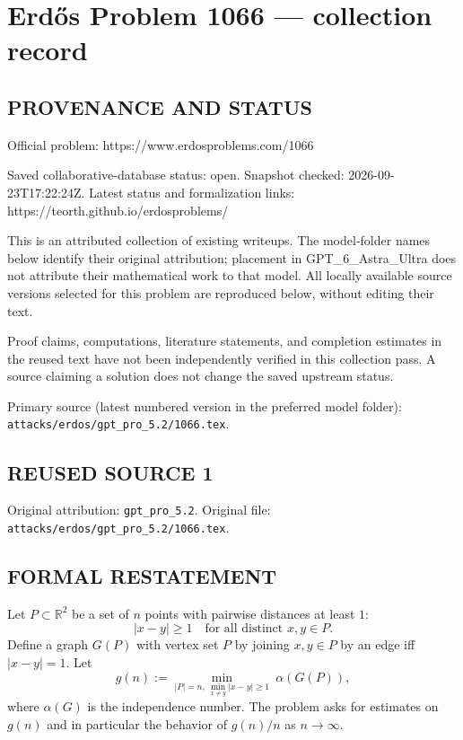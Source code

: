 \section*{Erd\H{o}s Problem 1066 --- collection record}

\subsection*{PROVENANCE AND STATUS}
Official problem: https://www.erdosproblems.com/1066

Saved collaborative-database status: open.
Snapshot checked: 2026-09-23T17:22:24Z.
Latest status and formalization links: https://teorth.github.io/erdosproblems/

This is an attributed collection of existing writeups. The model-folder names below identify their original attribution; placement in GPT\_6\_Astra\_Ultra does not attribute their mathematical work to that model. All locally available source versions selected for this problem are reproduced below, without editing their text.

Proof claims, computations, literature statements, and completion estimates in the reused text have not been independently verified in this collection pass. A source claiming a solution does not change the saved upstream status.

Primary source (latest numbered version in the preferred model folder): \texttt{attacks/erdos/gpt\_pro\_5.2/1066.tex}.

\subsection*{REUSED SOURCE 1}
Original attribution: \texttt{gpt\_pro\_5.2}.
Original file: \texttt{attacks/erdos/gpt\_pro\_5.2/1066.tex}.


\subsection*{FORMAL RESTATEMENT}
Let $P\subset\mathbb{R}^2$ be a set of $n$ points with pairwise distances at least $1$:
\[
|x-y|\ge 1\quad\text{for all distinct }x,y\in P.
\]
Define a graph $G(P)$ with vertex set $P$ by joining $x,y\in P$ by an edge iff $|x-y|=1$.
Let
\[
 g(n) := \min_{|P|=n,\ \min_{x\ne y}|x-y|\ge 1}\ \alpha(G(P)),
\]
where $\alpha(G)$ is the independence number.
The problem asks for estimates on $g(n)$ and in particular the behavior of $g(n)/n$ as $n\to\infty$.

